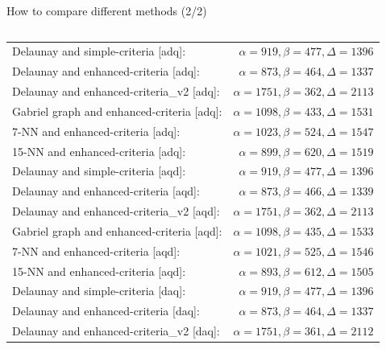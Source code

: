 \begin{frame}{How to compare different methods (2/2)}
    \begin{table}[!ht]
        \tiny
        \centering
        \begin{columns}
            \begin{column}{0.5\paperwidth}
                \begin{tabular}{lr}
                    Delaunay and simple-criteria [adq]: & $\alpha = 919, \beta = 477, \Delta = 1396$\\
                    Delaunay and enhanced-criteria [adq]: & $\alpha = 873, \beta = 464, \Delta = 1337$\\
                    Delaunay and enhanced-criteria\_v2 [adq]: & $\alpha = 1751, \beta = 362, \Delta = 2113$\\
                    Gabriel graph and enhanced-criteria [adq]: & $\alpha = 1098, \beta = 433, \Delta = 1531$\\
                    7-NN and enhanced-criteria [adq]: & $\alpha = 1023, \beta = 524, \Delta = 1547$\\
                    15-NN and enhanced-criteria [adq]: & $\alpha = 899, \beta = 620, \Delta = 1519$\\
                    \hline
                    Delaunay and simple-criteria [aqd]: & $\alpha = 919, \beta = 477, \Delta = 1396$\\
                    Delaunay and enhanced-criteria [aqd]: & $\alpha = 873, \beta = 466, \Delta = 1339$\\
                    Delaunay and enhanced-criteria\_v2 [aqd]: & $\alpha = 1751, \beta = 362, \Delta = 2113$\\
                    Gabriel graph and enhanced-criteria [aqd]: & $\alpha = 1098, \beta = 435, \Delta = 1533$\\
                    7-NN and enhanced-criteria [aqd]: & $\alpha = 1021, \beta = 525, \Delta = 1546$\\
                    15-NN and enhanced-criteria [aqd]: & $\alpha = 893, \beta = 612, \Delta = 1505$\\
                    \hline
                    Delaunay and simple-criteria [daq]: & $\alpha = 919, \beta = 477, \Delta = 1396$\\
                    Delaunay and enhanced-criteria [daq]: & $\alpha = 873, \beta = 464, \Delta = 1337$\\
                    Delaunay and enhanced-criteria\_v2 [daq]: & $\alpha = 1751, \beta = 361, \Delta = 2112$\\

\end{tabular}
\end{column}
\end{columns}
\end{table}
\end{frame}
